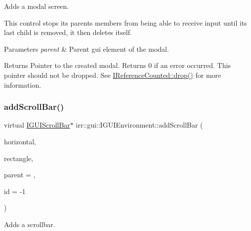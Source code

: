 Adds a modal screen. 

This control stops its parent\textquotesingle{}s members from being able to receive input until its last child is removed, it then deletes itself. 
\begin{DoxyParams}{Parameters}
{\em parent} & Parent gui element of the modal. \\
\hline
\end{DoxyParams}
\begin{DoxyReturn}{Returns}
Pointer to the created modal. Returns 0 if an error occurred. This pointer should not be dropped. See \hyperlink{classirr_1_1IReferenceCounted_a03856a09355b89d178090c4a5f738543}{I\+Reference\+Counted\+::drop()} for more information. 
\end{DoxyReturn}
\mbox{\label{classirr_1_1gui_1_1IGUIEnvironment_aff82c4b3935eaf56ce638996f5e002c9}} 
\subsubsection{\texorpdfstring{add\+Scroll\+Bar()}{addScrollBar()}}
{\footnotesize\ttfamily virtual \hyperlink{classirr_1_1gui_1_1IGUIScrollBar}{I\+G\+U\+I\+Scroll\+Bar}$\ast$ irr\+::gui\+::\+I\+G\+U\+I\+Environment\+::add\+Scroll\+Bar (\begin{DoxyParamCaption}\item[{bool}]{horizontal,  }\item[{const \hyperlink{classirr_1_1core_1_1rect}{core\+::rect}$<$ \hyperlink{namespaceirr_ac66849b7a6ed16e30ebede579f9b47c6}{s32} $>$ \&}]{rectangle,  }\item[{\hyperlink{classirr_1_1gui_1_1IGUIElement}{I\+G\+U\+I\+Element} $\ast$}]{parent = {},  }\item[{\hyperlink{namespaceirr_ac66849b7a6ed16e30ebede579f9b47c6}{s32}}]{id = {\ttfamily -\/1} }\end{DoxyParamCaption})\hspace{0.3cm}{\ttfamily [pure virtual]}}



Adds a scrollbar. 


